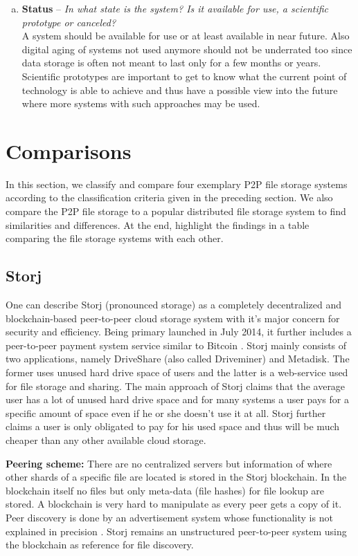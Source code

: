 \begin{enumerate}[(a)]
\item \textbf{Status} -- \textit{In what state is the system? Is it available for use, a scientific prototype or canceled?}\\
A system should be available for use or at least available in near future. Also digital aging of systems not used anymore should not be underrated too since data storage is often not meant to last only for a few months or years. Scientific prototypes are important to get to know what the current point of technology is able to achieve and thus have a possible view into the future where more systems with such approaches may be used.
\end{enumerate}

\section{Comparisons}
\label{comparisons}
In this section, we classify and compare four exemplary P2P file storage systems according to the classification criteria given in the preceding section. We also compare the P2P file storage to a popular distributed file storage system to find similarities and differences. At the end, highlight the findings in a table comparing the file storage systems with each other.

\subsection{Storj}
One can describe Storj (pronounced storage) as a completely decentralized and blockchain-based peer-to-peer cloud storage system with it's major concern for security and efficiency. Being primary launched in July 2014, it further includes a peer-to-peer payment system service similar to Bitcoin \cite{storj:blog:what_is_storj}. Storj mainly consists of two applications, namely DriveShare (also called Driveminer) and Metadisk. The former uses unused hard drive space of users and the latter is a web-service used for file storage and sharing. The main approach of Storj claims that the average user has a lot of unused hard drive space and for many systems a user pays for a specific amount of space even if he or she doesn't use it at all. Storj further claims a user is only obligated to pay for his used space and thus will be much cheaper than any other available cloud storage.

\textbf{Peering scheme:} There are no centralized servers but information of where other shards of a specific file are located is stored in the Storj blockchain. In the blockchain itself no files but only meta-data (file hashes) for file lookup are stored. A blockchain is very hard to manipulate as every peer gets a copy of it. Peer discovery is done by an advertisement system whose functionality is not explained in precision \cite{storj:PDF}. Storj remains an unstructured peer-to-peer system using the blockchain as reference for file discovery.


